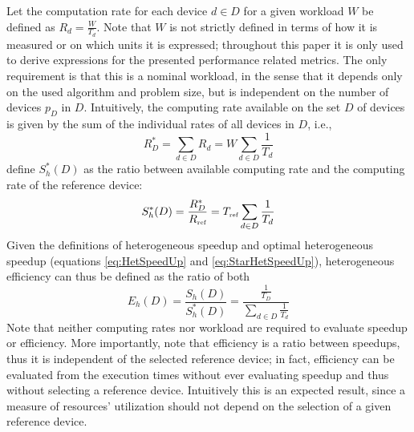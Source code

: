 Let the computation rate for each device $d \in D$ for a given workload $W$ be defined as $R_d = \frac{W}{T_d}$. Note that $W$ is not strictly defined in terms of how it is measured or on which units it is expressed; throughout this paper it is only used to derive expressions for the presented performance related metrics. The only requirement is that this is a nominal workload, in the sense that it depends only on the used algorithm and problem size, but is independent on the number of devices $p_D$ in $D$. Intuitively, the computing rate available on the set $D$ of devices is given by the sum of the individual rates of all devices in $D$, i.e.,
\begin{equation}
R^*_D = \sum_{d \in D} R_d = W \sum_{d \in D} \frac{1}{T_d}
\label{eq:StarCapacity}
\end{equation}
\cite{Chamberlain98} define $S_h^*(D)$ as the ratio between available computing rate and the computing rate of the reference device:
\begin{equation}
S^*_h(D) = \frac{R^*_D}{R_{\mbox{\tiny ref}}} = T_{\mbox{\tiny ref}} \sum_{d \in D} \frac{1}{T_d}
\label{eq:StarHetSpeedUp}
\end{equation}
Given the definitions of heterogeneous speedup and optimal heterogeneous speedup (equations \ref{eq:HetSpeedUp} and \ref{eq:StarHetSpeedUp}), heterogeneous efficiency can thus be defined as the ratio of both
\begin{equation}
E_h(D) = \frac{S_h(D)}{S_h^*(D)} = \frac{\frac{1}{T_D}}{\sum_{d \in D} \frac{1}{T_d}}
\label{eq:HetEff}
\end{equation}
Note that neither computing rates nor workload are required to evaluate speedup or efficiency. More importantly, note that efficiency is a ratio between speedups, thus it is independent of the selected reference device; in fact, efficiency can be evaluated from the execution times without ever evaluating speedup and thus without selecting a reference device. Intuitively this is an expected result, since a measure of resources' utilization should not depend on the selection of a given reference device.